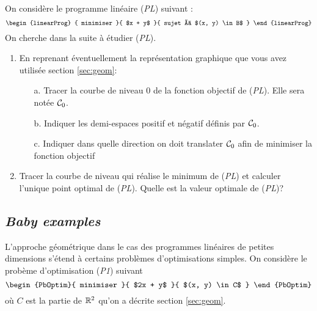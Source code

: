 \documentclass[11pt, a4paper]{article}
\begin{document}
\noindent On considère le programme linéaire (\emph{PL}) suivant :
\begin{displaymath}
  \begin{linearProg} {
      minimiser
    }{
      $x + y$
    }{
      sujet à $(x, y) \in B$
    }
  \end{linearProg}
\end{displaymath}
On cherche dans la suite à étudier (\emph{PL}).
\begin{question}{4}
  \begin{enumerate}
  \item En reprenant éventuellement la représentation graphique que
    vous avez utilisée section \ref{sec:geom}:
    \begin{enumerate}
    \item[a.]  Tracer la courbe de niveau $0$ de la fonction objectif
      de (\emph{PL}). Elle sera notée $\mathcal{C}_0$.
    \item[b.]  Indiquer les demi-espaces positif et négatif définis
      par $\mathcal{C}_0$.
    \item[c.]  Indiquer dans quelle direction on doit translater
      $\mathcal{C}_0$ afin de minimiser la fonction objectif
    \end{enumerate}
  \item
    Tracer la courbe de niveau qui réalise le minimum de (\emph{PL})
    et calculer l'unique point optimal de (\emph{PL}). Quelle est la
    valeur optimale de (\emph{PL})?
  \end{enumerate}
\end{question}

\subsection{\emph{Baby examples}}

\noindent L'approche géométrique dans le cas des programmes linéaires
de petites dimensions s'étend à certains problèmes d'optimisations
simples. On considère le probème d'optimisation (\emph{P1}) suivant
\[
\begin{PbOptim}{
    minimiser
  }{
    $2x + y$
  }{
    $(x, y) \in C$
  }
\end{PbOptim}
\]
où $C$ est la partie de $\mathbb{R}^2$ qu'on a décrite section \ref{sec:geom}.
\end{document}
